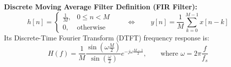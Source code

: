 \documentclass[10pt,a4paper]{article}
\begin{document}
\begin{tcolorbox}[
    colframe=themeblue,
    colback=lightbg,
    arc=1.2mm,
    boxrule=0.5pt,
    left=5pt, right=5pt, top=2.5pt, bottom=2.5pt
]
\footnotesize
\textbf{Discrete Moving Average Filter Definition (FIR Filter):}
\begin{equation}
    h[n] = \begin{cases} \frac{1}{M}, & 0 \le n < M \\ 0, & \text{otherwise} \end{cases} \qquad \Longleftrightarrow \qquad y[n] = \frac{1}{M} \sum_{k=0}^{M-1} x[n - k]
\end{equation}
Its Discrete-Time Fourier Transform (DTFT) frequency response is:
\begin{equation}
    H(f) = \frac{1}{M} \frac{\sin\left(\omega \frac{M}{2}\right)}{\sin\left(\frac{\omega}{2}\right)} e^{-j\omega \frac{M-1}{2}}, \qquad \text{where } \omega = 2\pi \frac{f}{f_s}
\end{equation}
\end{tcolorbox}

\vspace{1pt}
\end{document}
